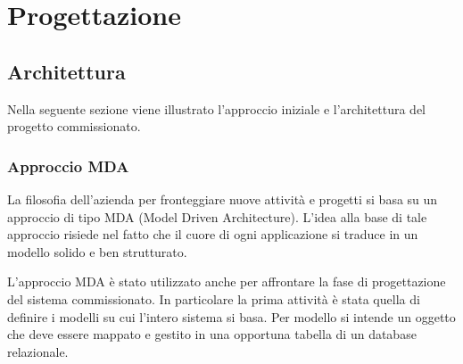 \chapter{Progettazione}
\label{cap:progettazione}


\setlength{\parskip}{3ex}

\section{Architettura}
Nella seguente sezione viene illustrato l'approccio iniziale e l'architettura del progetto commissionato.

\subsection{Approccio MDA}
La filosofia dell'azienda per fronteggiare nuove attività e progetti si basa su un approccio di tipo MDA (Model Driven Architecture). L'idea alla base di tale approccio risiede nel fatto che il cuore di ogni applicazione si traduce in un modello solido e ben strutturato. 

\setlength{\parskip}{3ex}

\noindent L'approccio MDA è stato utilizzato anche per affrontare la fase di progettazione del sistema commissionato. In particolare la prima attività è stata quella di definire i modelli su cui l'intero sistema si basa. Per modello si intende un oggetto che deve essere mappato e gestito in una opportuna tabella di un database relazionale.   

\pagebreak

